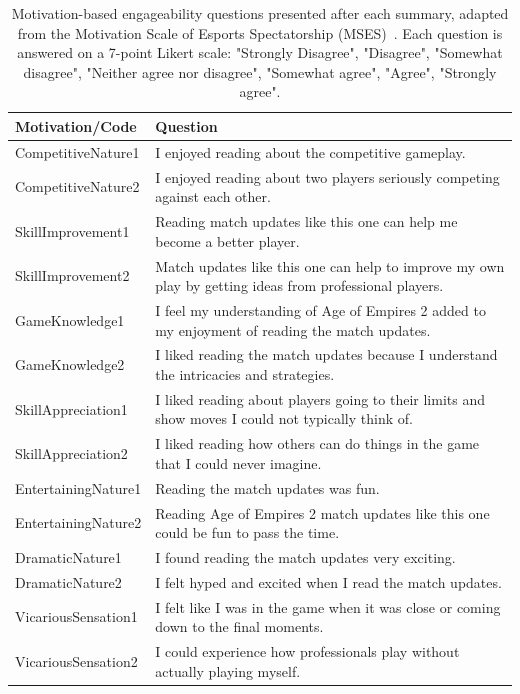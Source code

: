 \renewcommand{\arraystretch}{1.5}
\begin{table}[H]
  \centering\small\sloppy
  \begin{tabularx}{\textwidth}{>{\RaggedRight\arraybackslash}p{4.5cm} >{\RaggedRight\arraybackslash}X}
    \textbf{Motivation/Code} & \textbf{Question} \\
    \midrule
    CompetitiveNature1 & I enjoyed reading about the competitive gameplay. \\
    CompetitiveNature2 & I enjoyed reading about two players seriously competing against each other. \\
    SkillImprovement1 & Reading match updates like this one can help me become a better player. \\
    SkillImprovement2 & Match updates like this one can help to improve my own play by getting ideas from professional players. \\
    GameKnowledge1 & I feel my understanding of Age of Empires 2 added to my enjoyment of reading the match updates. \\
    GameKnowledge2 & I liked reading the match updates because I understand the intricacies and strategies. \\
    SkillAppreciation1 & I liked reading about players going to their limits and show moves I could not typically think of. \\
    SkillAppreciation2 & I liked reading how others can do things in the game that I could never imagine. \\
    EntertainingNature1 & Reading the match updates was fun. \\
    EntertainingNature2 & Reading Age of Empires 2 match updates like this one could be fun to pass the time. \\
    DramaticNature1 & I found reading the match updates very exciting. \\
    DramaticNature2 & I felt hyped and excited when I read the match updates. \\
    VicariousSensation1 & I felt like I was in the game when it was close or coming down to the final moments. \\
    VicariousSensation2 & I could experience how professionals play without actually playing myself. \\
  \end{tabularx}
  \caption{Motivation-based engageability questions presented after each summary, adapted from the Motivation Scale of Esports Spectatorship (MSES)~\cite{qian2020}. Each question is answered on a 7-point Likert scale: "Strongly Disagree", "Disagree", "Somewhat disagree", "Neither agree nor disagree", "Somewhat agree", "Agree", "Strongly agree".}
  \label{tab:engageability-questions}
\end{table}


